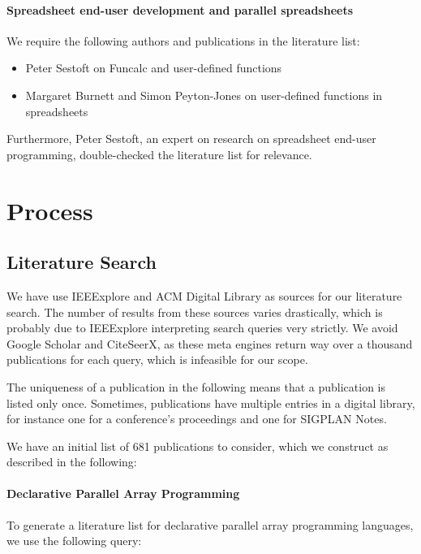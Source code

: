 \documentclass[a4paper]{article}
\begin{document}
\paragraph{Spreadsheet end-user development and parallel spreadsheets}

We require the following authors and publications in the literature list:

\begin{itemize}
\item Peter Sestoft on Funcalc and user-defined functions
\item Margaret Burnett and Simon Peyton-Jones on user-defined
  functions in spreadsheets
\end{itemize}

Furthermore, Peter Sestoft, an expert on research on spreadsheet end-user programming, double-checked the literature list for relevance.

\section{Process}
\label{sec:process}

\subsection{Literature Search}
\label{sec:literature-search}

We have use IEEExplore and ACM Digital Library as sources for our literature search. The number of results from these sources varies drastically, which is probably due to IEEExplore interpreting search queries very strictly. We avoid Google Scholar and CiteSeerX, as these meta engines return way over a thousand publications for each query,
which is infeasible for our scope.

The uniqueness of a publication in the following means that a publication is listed only once. Sometimes, publications have multiple entries in a digital library, for instance one for a conference's proceedings and one for SIGPLAN Notes.

We have an initial list of 681 publications to consider, which we construct as described in the following:

\paragraph{Declarative Parallel Array Programming}

To generate a literature list for declarative parallel array programming languages, we use the following query:
\end{document}
